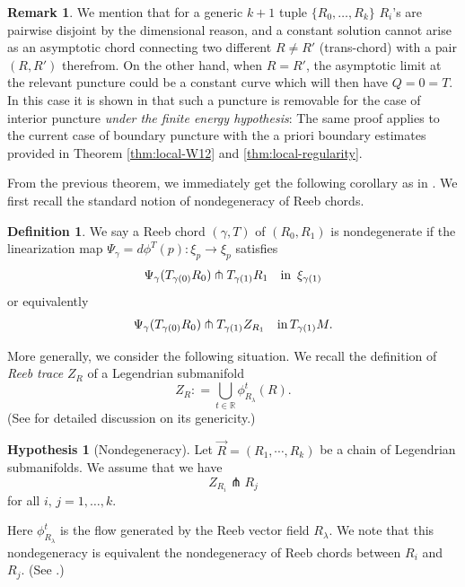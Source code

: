 \documentclass[reqno]{amsart}
\def\R{\ifmmode{\mathbb R}\else{$\mathbb R$}\fi} %
\theoremstyle{theorem}
\theoremstyle{definition}
\newtheorem{defn}[thm]{Definition}
\newtheorem{rem}[thm]{Remark}
\newtheorem{hypo}[thm]{Hypothesis}
\numberwithin{equation}{section}
\def\R{{\mathbb R}}
\def\R{{\mathbb R}}
\def\R{\ifmmode{\mathbb R}\else{$\mathbb R$}\fi} %
\def\R{{\mathbb R}}
\def\R{{\mathbb R}}
\begin{document}
\begin{rem} We mention that for a generic $k+1$ tuple $\{R_0,\ldots, R_k\}$
 $R_i$'s are pairwise disjoint  by the dimensional reason, and a constant solution
 cannot arise as an asymptotic chord connecting two different $R \neq R' $ (trans-chord)
 with a pair $(R,R')$ therefrom. On the other hand, when $R = R'$, the asymptotic
 limit at the relevant puncture could be a constant curve which will then have $Q = 0 = T$.
 In this case it is shown in \cite[Theorem 8.7]{oh:contacton} that such a puncture is
 removable for the case of interior puncture \emph{under the finite energy hypothesis}:
 The same proof applies to the current case
 of boundary puncture with the a priori boundary estimates provided in Theorem \ref{thm:local-W12}
 and \ref{thm:local-regularity}.
 \end{rem}

From the previous theorem, we  immediately get the following corollary as in \cite[Section 8]{oh-wang:CR-map1}. We first recall the standard notion of nondegeneracy of Reeb chords.

\begin{defn}\label{defn:nondegeneracy-chords}
We say a Reeb chord $(\gamma, T)$ of $(R_0,R_1)$ is nondegenerate if
the linearization map $\Psi_\gamma = d\phi^T(p): \xi_p \to \xi_p$ satisfies
$$
\Psi_\gamma(T_{\gamma(0)} R_0) \pitchfork T_{\gamma(1)} R_1  \quad \text{\rm in }  \,  \xi_{\gamma(1)}
$$
or equivalently
$$
\Psi_\gamma(T_{\gamma(0)} R_0) \pitchfork T_{\gamma(1)} Z_{R_1} \quad \text{\rm in} \, T_{\gamma(1)}M.
$$
\end{defn}
More generally, we consider the following situation.
We recall the definition of \emph{Reeb trace} $Z_R$ of a Legendrian submanifold
$$
Z_R: = \bigcup_{t \in \R} \phi_{R_\lambda}^t(R).
$$
(See \cite[Appendix B]{oh:contacton-transversality} for detailed discussion on its genericity.)
\begin{hypo}[Nondegeneracy]\label{hypo:nondegeneracy}
Let $\vec{R}=(R_1,\cdots,R_k)$ be a chain of Legendrian submanifolds.
We assume that we have
$$
Z_{R_i} \pitchfork R_j
$$
for all $i, \, j= 1,\ldots, k$.
\end{hypo}
Here $\phi^t_{R_\lambda}$ is the flow generated by the Reeb vector field $R_\lambda$.
We note that this nondegeneracy is equivalent the nondegeneracy of Reeb chords between $R_i$ and $R_j$.
(See \cite[Corollary 4.8]{oh:entanglement1}.)
\end{document}
